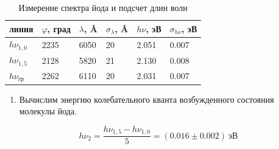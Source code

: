 \documentclass[a4paper,12pt]{article}
\begin{document}
\begin{table}[h]
    \centering
    \begin{tabular}{l|l|l|l|l|l}
        \hline
        линия             & $\varphi$, град & $\lambda$, \AA & $\sigma_\lambda$, \AA & $h\nu$, эВ & $\sigma_{h\nu}$, эВ \\ \hline
        $h \nu_{1,0}$     & 2235 & 6050 & 20 & 2.051 & 0.007 \\
        $h \nu_{1,5}$     & 2128 & 5820 & 21 & 2.130 & 0.008 \\
        $h \nu_\text{гр}$ & 2262 & 6110 & 20 & 2.031 & 0.007 \\ \hline
    \end{tabular}
    \caption{Измерение спектра йода и подсчет длин волн}
    \label{table:I_measurements}
\end{table}

\begin{enumerate}[resume]
    \item Вычислим энергию колебательного кванта возбужденного состояния молекулы йода.
\end{enumerate}

\begin{equation*}
    h \nu_2 = \frac{h \nu_{1,5} - h \nu_{1,0}}{5} = (0.016 \pm 0.002) \ \text{эВ}
\end{equation*}
\end{document}

